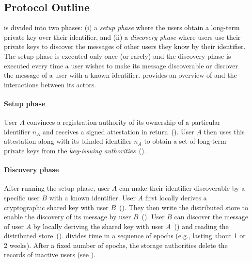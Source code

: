 \subsection{Protocol Outline} \label{sec:protocol-overview}
\sysname is divided into two phases: (i) a \emph{setup phase} where the users obtain a long-term private key over their identifier, and (ii) a \emph{discovery phase} where users use their private keys to discover the messages of other users they know by their identifier. The setup phase is executed only once (or rarely) and the discovery phase is executed every time a user wishes to make its message discoverable or discover the message of a user with a known identifier.
%
 provides an overview of \sysname and the interactions between its actors.

\paragraph{Setup phase}
User $A$ convinces a registration authority of its ownership of a particular identifier $n_A$ and receives a signed attestation in return~(\one).
%
User $A$ then uses this attestation along with its blinded identifier $n_A$ to obtain a set of long-term private keys from the \sysname \emph{key-issuing authorities}~(\two).

\paragraph{Discovery phase}
After running the setup phase, user $A$ can make their identifier discoverable by a specific user $B$ with a known identifier. User $A$ first locally derives a cryptographic shared key with user $B$~(\three). They then write the distributed \sysname store to enable the discovery of its message by user $B$~(\four).
%
User $B$ can discover the message of user $A$ by locally deriving the shared key with user $A$~(\five) and reading the distributed \sysname store~(\six).
%
\sysname divides time in a sequence of epochs (e.g., lasting about 1 or 2 weeks). After a fixed number of epochs, the storage authorities delete the records of inactive users (see ).


